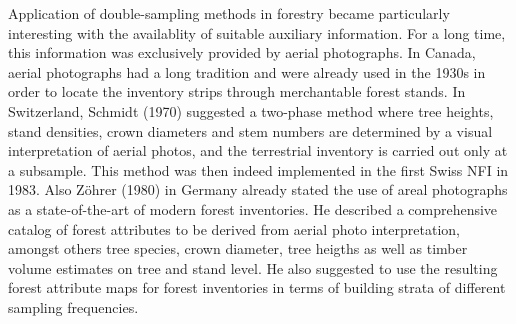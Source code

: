 Application of double-sampling methods in forestry became particularly interesting with the availablity of suitable auxiliary information. For a long time, this information was exclusively provided by aerial photographs. In Canada, aerial photographs had a long tradition and were already used in the 1930s in order to locate the inventory strips through merchantable forest stands. In Switzerland, Schmidt (1970) suggested a two-phase method where tree heights, stand densities, crown diameters and stem numbers are determined by a visual interpretation of aerial photos, and the terrestrial inventory is carried out only at a subsample. This method was then indeed implemented in the first Swiss NFI in 1983. Also Zöhrer (1980) in Germany already stated the use of areal photographs as a state-of-the-art of modern forest inventories. He described a comprehensive catalog of forest attributes to be derived from aerial photo interpretation, amongst others tree species, crown diameter, tree heigths as well as timber volume estimates on tree and stand level. He also suggested to use the resulting forest attribute maps for forest inventories in terms of building strata of different sampling frequencies.







%
%
%
%
%
%
%
%
%
%
%
%
%
%
%
%
%
%
%
%
%
%
%






































